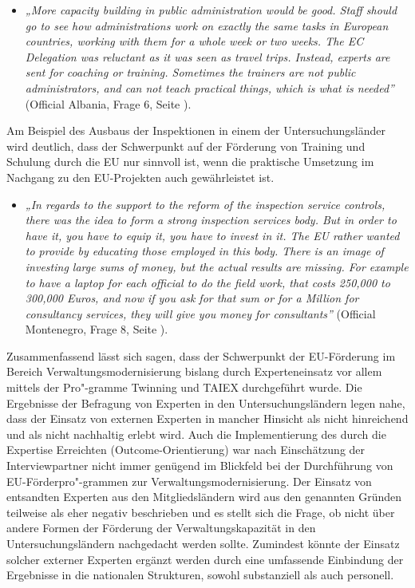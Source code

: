 \begin{itemize}[label={}]
\item \textit{„More capacity building in public administration would be good. Staff should go to see how administrations work on exactly the same tasks in European countries, working with them for a whole week or two weeks. The EC Delegation was reluctant as it was seen as travel trips. Instead, experts are sent for coaching or training. Sometimes the trainers are not public administrators, and can not teach practical things, which is what is needed”} (Official Albania, Frage 6, Seite \pageref{sec:par view}).
\end{itemize}
Am Beispiel des Ausbaus der Inspektionen in einem der Untersuchungsländer wird deutlich, dass der Schwerpunkt auf der Förderung von Training und Schulung durch die EU nur sinnvoll ist, wenn die praktische Umsetzung im Nachgang zu den EU-Projekten auch gewährleistet ist.
\begin{itemize}[label={}]
\item \textit{„In regards to the support to the reform of the inspection service controls, there was the idea to form a strong inspection services body. But in order to have it, you have to equip it, you have to invest in it. The EU rather wanted to provide by educating those employed in this body. There is an image of investing large sums of money, but the actual results are missing. For example to have a laptop for each official to do the field work, that costs 250,000 to 300,000 Euros, and now if you ask for that sum or for a Million for consultancy services, they will give you money for consultants”} (Official Montenegro, Frage 8, Seite \pageref{sec:par technical}).
\end{itemize}
Zusammenfassend lässt sich sagen, dass der Schwerpunkt der EU-Förderung im Bereich Verwaltungsmodernisierung bislang durch Experteneinsatz vor allem mittels der Pro"-gramme Twinning und TAIEX durchgeführt wurde. Die Ergebnisse der Befragung von Experten in den Untersuchungsländern legen nahe, dass der Einsatz von externen Experten in mancher Hinsicht als nicht hinreichend und als nicht nachhaltig erlebt wird. Auch die Implementierung des durch die Expertise Erreichten (Outcome-Orientierung) war nach Einschätzung der Interviewpartner nicht immer genügend im Blickfeld bei der Durchführung von EU-Förderpro"-grammen zur Verwaltungsmodernisierung. Der Einsatz von entsandten Experten aus den Mitgliedsländern wird aus den genannten Gründen teilweise als eher negativ beschrieben und es stellt sich die Frage, ob nicht über andere Formen der Förderung der Verwaltungskapazität in den Untersuchungsländern nachgedacht werden sollte. Zumindest könnte der Einsatz solcher externer Experten ergänzt werden durch eine umfassende Einbindung der Ergebnisse in die nationalen Strukturen, sowohl substanziell als auch personell. \par
